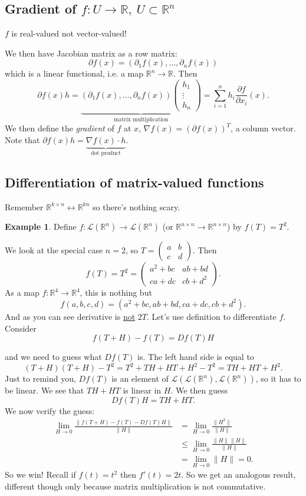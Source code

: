 \documentclass[a4paper]{article}
\theoremstyle{definition}
\newtheorem{eg}[defn]{Example}
\begin{document}
\subsection{Gradient of $f:U\rightarrow \mathbb R,\ U\subset \mathbb R^n$}
$f$ is real-valued not vector-valued!

We then have Jacobian matrix as a row matrix:
\[
\partial f(x) = \left(\partial _1 f(x),\ldots,\partial _n f(x)\right)
\]
which is a linear functional, i.e. a map $\mathbb R^n \rightarrow \mathbb R$. Then
\[
\partial f(x) h = \underbrace{\left(\partial _1 f(x),\ldots,\partial _n f(x)\right) \begin{pmatrix}
h_1 \\ \vdots \\ h_n
\end{pmatrix}}_{\text{matrix multiplication}} = \sum_{i=1}^n h_i \frac{\partial f}{\partial x_i} (x) .
\]
We then define the \textit{gradient} of $f$ at $x$, $\nabla f(x) = (\partial f(x))^T$, a column vector. Note that $\partial f(x) h =\underbrace{\nabla f(x) \cdot h}_{\text{dot product}}$.

\subsection{Differentiation of matrix-valued functions}
Remember $\mathbb R^{k\times n} \leftrightarrow \mathbb R^{kn}$ so there's nothing scary.
\begin{eg}
Define $f:\mathcal L(\mathbb R^n) \rightarrow \mathcal L(\mathbb R^n)$ (or $\mathbb R^{n\times n}\rightarrow \mathbb R^{n\times n}$) by $f(T)=T^2$.

We look at the special case $n=2$, so $T=\begin{pmatrix}
a & b \\ c & d
\end{pmatrix} .$ Then
\[
f(T)=T^2 = \begin{pmatrix}
a^2+bc & ab+bd \\ ca+dc & cb+d^2
\end{pmatrix} .
\]
As a map $f:\mathbb R^4 \rightarrow \mathbb R^4$, this is nothing but
\[
f(a,b,c,d) = \left(a^2+bc, ab+bd, ca+dc, cb+d^2\right).
\]
And as you can see derivative is \underline{not} $2T$. Let's use definition to differentiate $f$. Consider
\[
f(T+H)-f(T) = Df(T)H
\]
\end{eg}
and we need to guess what $Df(T)$ is. The left hand side is equal to
\[
(T+H)(T+H)-T^2 = T^2+TH+HT+H^2-T^2=TH+HT+H^2 .
\]
Just to remind you, $Df(T)$ is an element of $\mathcal L(\mathcal L(\mathbb R^n),\mathcal L(\mathbb R^n))$, so it has to be linear. We see that $TH+HT$ is linear in $H$. We then guess
\[
Df(T)H = TH+HT.
\]
We now verify the guess:
\[
\begin{aligned}
\lim_{H\rightarrow 0} \frac{\|f(T+H)-f(T)-Df(T)H\|}{\|H\|} &= \lim_{H\rightarrow 0} \frac{\|H^2\|}{\|H\|} \\ &\leq \lim_{H\rightarrow 0} \frac{\|H\|\|H\|}{\|H\|} \\ &= \lim_{H\rightarrow 0} \|H\| = 0.
\end{aligned}
\]
So we win!
Recall if $f(t)=t^2$ then $f'(t)=2t$. So we get an analogous result, different though only because matrix multiplication is not commutative.
\end{document}
